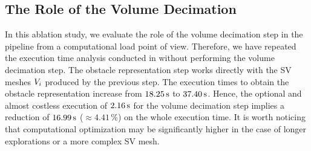 \subsection{The Role of the Volume Decimation}
\label{subsec:roleOfVolDeci}
In this ablation study, 
we evaluate the role of the volume decimation step in the pipeline from a computational load point of view. 
Therefore, 
we have repeated the execution time analysis conducted in  without performing the volume decimation step. 
The obstacle representation step works directly with the SV meshes ${V_{i}}$ produced by the previous step.
The execution times to obtain the obstacle representation increase from ${18.25\,\text{s}}$ to ${37.40\,\text{s}}$. 
Hence, 
the optional and almost costless execution of ${2.16\,\text{s}}$ for the volume decimation step implies a reduction of ${16.99\,\text{s}}$ ($\approx 4.41\,\%$) on the whole execution time. 
It is worth noticing that computational optimization may be significantly higher in the case of longer explorations or a more complex SV mesh.
